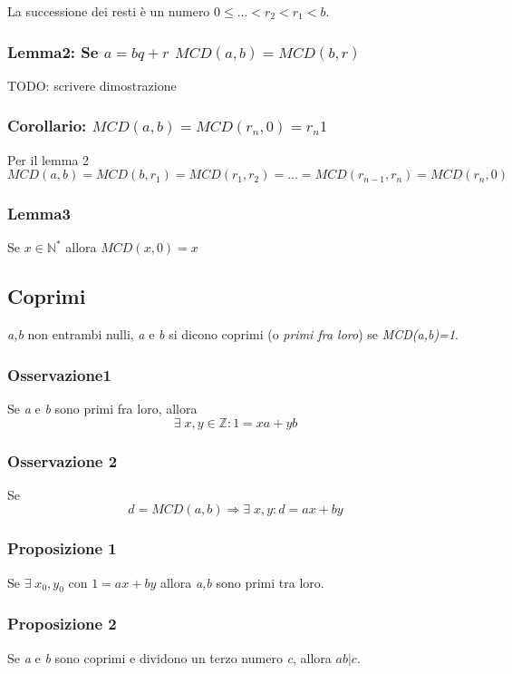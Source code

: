 La successione dei resti è un numero \(0\leq ... <r_2<r_1<b\).

\subsubsection{Lemma2: Se \(a=bq+r\) \(MCD(a,b)=MCD(b,r)\)}
TODO: scrivere dimostrazione

\subsubsection{Corollario: \(MCD(a,b)=MCD(r_n,0)=r_n1\)}
Per il lemma 2 \(MCD(a,b)=MCD(b,r_1)=MCD(r_1,r_2)=...=MCD(r_{n-1},r_n)=MCD(r_n,0)\)

\subsubsection{Lemma3}
Se \(x\in\mathbb{N^*}\) allora \(MCD(x,0)=x\)

\subsection{Coprimi}
\textit{a,b} non entrambi nulli, \textit{a} e \textit{b} si dicono coprimi (o \textit{primi fra loro}) se \textit{MCD(a,b)=1}.

\subsubsection{Osservazione1}
Se \textit{a} e \textit{b} sono primi fra loro, allora \[\exists\; x,y\in\mathbb{Z} : 1=xa+yb\]

\subsubsection{Osservazione 2}
Se \[d=MCD(a,b)\Rightarrow\exists\; x,y:d=ax+by\]

\subsubsection{Proposizione 1}
Se \(\exists\; x_0,y_0\) con \(1=ax+by\) allora \textit{a,b} sono primi tra loro.

\subsubsection{Proposizione 2}
Se \textit{a} e \textit{b} sono coprimi e dividono un terzo numero \textit{c}, allora \(ab|c\).

